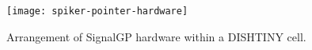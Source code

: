 \begin{figure}[t]
\begin{center}
\texttt{[image: spiker-pointer-hardware]}
\caption{
Arrangement of SignalGP hardware within a DISHTINY cell.
}
\label{fig:spiker_pointer_hardware}
\end{center}
\end{figure}
